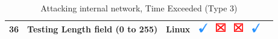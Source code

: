 \documentclass[12pt]{article}
\begin{document}
\begin{savenotes}
\begin{table}[!h]
{{\begin{tabular}{|C{1.0cm}|L{6.0cm}|C{1.5cm}|C{1.0cm}|C{1.0cm}|C{1.0cm}|C{1.0cm}|L{7.0cm}|}
36&Testing Length field (0 to 255)&Linux&\includegraphics[width=4mm, height=4mm]{ok}&\includegraphics[width=4mm, height=4mm]{notok}&\includegraphics[width=4mm, height=4mm]{notok}&\includegraphics[width=4mm, height=4mm]{ok}&\\
\hline
\end{tabular}}}
\caption{Attacking internal network, Time Exceeded (Type 3)}
\label{table:attackInternalResults3}
\end{table}
\end{savenotes}
\end{document}
